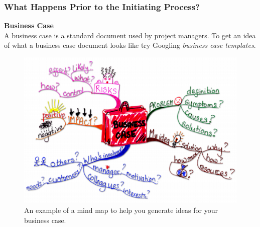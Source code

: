 \documentclass{beamer}
\begin{document}
\begin{frame}
\frametitle{What Happens Prior to the Initiating Process?}
\textbf{Business Case}\\
\vspace{0.2cm}
A business case is a standard document used by project managers. To get an idea of what a business case document looks like try Googling \textit{business case templates}.
\begin{figure}
\includegraphics[scale=0.25]{bus_case}
\caption{An example of a mind map to help you generate ideas for your business case.}
\end{figure}
\end{frame}
\end{document}
